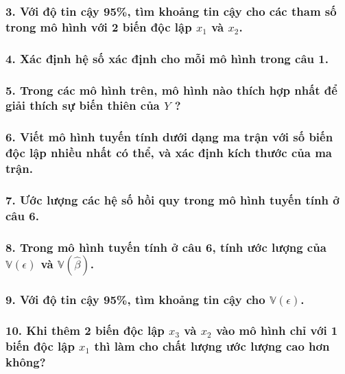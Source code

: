 \documentclass[a4paper]{article}
\theoremstyle{nonumberplain}
\begin{document}
\subsubsection*{3. Với độ tin cậy 95\%, tìm khoảng tin cậy cho các tham số trong mô hình với 2 biến độc lập $x_1$ và $x_2$.}


\subsubsection*{4. Xác định hệ số xác định cho mỗi mô hình trong câu 1.}


\subsubsection*{5. Trong các mô hình trên, mô hình nào thích hợp nhất để giải thích sự biến thiên của $Y$ ?}


\subsubsection*{6. Viết mô hình tuyến tính dưới dạng ma trận với số biến độc lập nhiều nhất có thể, và xác định kích thước của ma trận.}


\subsubsection*{7. Ước lượng các hệ số hồi quy trong mô hình tuyến tính ở câu 6.}


\subsubsection*{8. Trong mô hình tuyến tính ở câu 6, tính ước lượng của $\mathbb{V}(\epsilon)$ và $\mathbb{V}(\hat{\beta})$.}


\subsubsection*{9. Với độ tin cậy 95\%, tìm khoảng tin cậy cho $\mathbb{V}(\epsilon)$. }


\subsubsection*{10. Khi thêm 2 biến độc lập $x_3$ và $x_2$ vào mô hình chỉ với 1 biến độc lập $x_1$ thì làm cho chất lượng ước lượng cao hơn không?}
\end{document}
